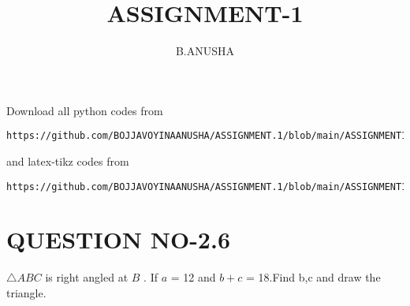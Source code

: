 \documentclass[journal,12pt,twocolumn]{IEEEtran}
\begin{document}
     \def\rightbox#1{\makebox[0in][r]{#1}}
     \def\centbox#1{\makebox[0in]{#1}}
     \def\topbox#1{\raisebox{-\baselineskip}[0in][0in]{#1}}
     \def\midbox#1{\raisebox{-0.5\baselineskip}[0in][0in]{#1}}
\vspace{3cm}
\title{ASSIGNMENT-1}
\author{B.ANUSHA}
\maketitle
\newpage
\bigskip
\renewcommand{\thefigure}{\theenumi}
\renewcommand{\thetable}{\theenumi}
Download all python codes from 
\begin{lstlisting}
https://github.com/BOJJAVOYINAANUSHA/ASSIGNMENT.1/blob/main/ASSIGNMENT1/assignment1.py
\end{lstlisting}
%
and latex-tikz codes from 
\begin{lstlisting}
https://github.com/BOJJAVOYINAANUSHA/ASSIGNMENT.1/blob/main/ASSIGNMENT1/main.tex
\end{lstlisting}
%
\section{QUESTION NO-2.6}
$\triangle ABC$ is right angled at $B$ . If $a$ = 12 and $b+c$ = 18.Find b,c and draw the triangle.
%
\end{document}
